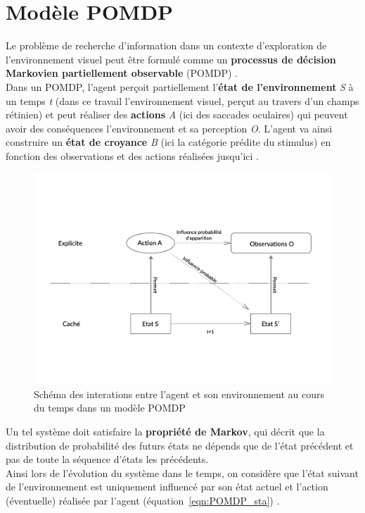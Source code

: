 \section{Modèle POMDP} %
Le problème de recherche d'information dans un contexte d'exploration de l'environnement visuel peut être formulé comme un \textbf{processus de décision Markovien partiellement observable} (POMDP) \autocite{Butko2010}. \\
Dans un POMDP, l'agent perçoit partiellement l'\textbf{état de l'environnement} \textit{S} à un temps \textit{t} (dans ce travail l'environnement visuel, perçut au travers d'un champs rétinien) et peut réaliser des \textbf{actions} \textit{A} (ici des saccades oculaires) qui peuvent avoir des conséquences l'environnement et sa perception \textit{O}. L'agent va ainsi construire un \textbf{état de croyance} \textit{B} (ici la catégorie prédite du stimulus) en fonction des observations et des actions réalisées jusqu'ici \autocite{Butko2010}.

\begin{figure}[th]
\centering
\includegraphics[scale=0.5]{Figures/POMDP}
\decoRule %
\caption[Figure]{Schéma des interations entre l'agent et son environnement au cours du temps dans un modèle POMDP}
\label{fig:POMDP}
\end{figure}

Un tel système doit satisfaire la \textbf{propriété de Markov}, qui décrit que la distribution de probabilité des futurs états ne dépends que de l'état précédent et pas de toute la séquence d'états les précédents.\\
Ainsi lors de l'évolution du système dans le temps, on considère que l'état suivant de l'environnement est uniquement influencé par son état actuel et l'action (éventuelle) réalisée par l'agent (équation~\ref{eqn:POMDP_sta}) \autocite{Butko2010}. 

